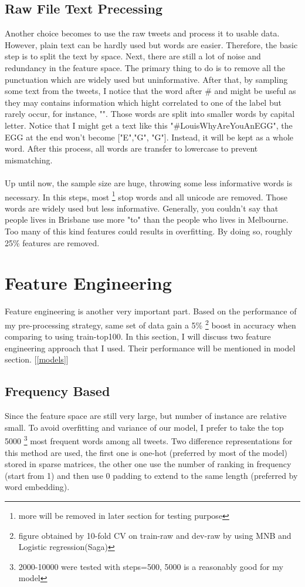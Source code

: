 \documentclass[11pt]{article}
\begin{document}
\subsection{Raw File Text Precessing}
Another choice becomes to use the raw tweets and process it to
usable data. 
However, plain text can be hardly used but words are easier. Therefore, the basic
step is to split the text by space. Next, 
there are still a lot of noise and redundancy in the feature space.
The primary thing to do is to remove all the punctuation
which are widely used but uninformative.
After that, by sampling some text from the tweets, I notice that the 
word after
\# and \@ might be useful as they may contains information which
hight correlated to one of the label but rarely occur, 
for instance, "". Those words are split into smaller words by capital letter. 
Notice that I might get a text like this "\#LouisWhyAreYouAnEGG", the EGG at the
end won't become ["E","G", "G"]. Instead, it will be kept as a whole word. 
After this process, all words are transfer to lowercase to 
prevent mismatching.
\\
\\
Up until now, the sample size are huge, throwing some less 
informative words is necessary. In this steps, most
\footnote{more will be removed in later section for testing purpose} stop words
and all unicode are removed.
Those words are widely used but less informative. Generally, you couldn't say that
people lives in Brisbane use more "to" than the people who lives in Melbourne. Too many 
of this kind features could results in overfitting.
By doing so, roughly 25\% features are removed.

\section{Feature Engineering}
\label{ext}
Feature engineering is another very important part.
Based on the performance of my pre-processing strategy, 
same set of data gain a 5\% 
\footnote{figure obtained by 10-fold CV on train-raw and dev-raw 
by using MNB and Logistic regression(Saga)}
boost in accuracy when comparing to using train-top100.
In this section, I will discuss two feature engineering approach that
I used. Their performance will be mentioned in model section.
[\ref{models}]

\subsection{Frequency Based}
Since the feature space are still very large, but number of instance
are relative small. To avoid overfitting and variance of our model, 
I prefer to take the top 5000
\footnote{2000-10000 were tested with steps=500, 5000 is a reasonably good
for my model}
most frequent words among all tweets. 
Two difference representations for this method are
used, the first one is one-hot (preferred by most of the model) stored in 
sparse matrices, the other one use the number of ranking in frequency 
(start from 1) and then use 
0 padding to extend to the same length (preferred by word embedding).
\end{document}
